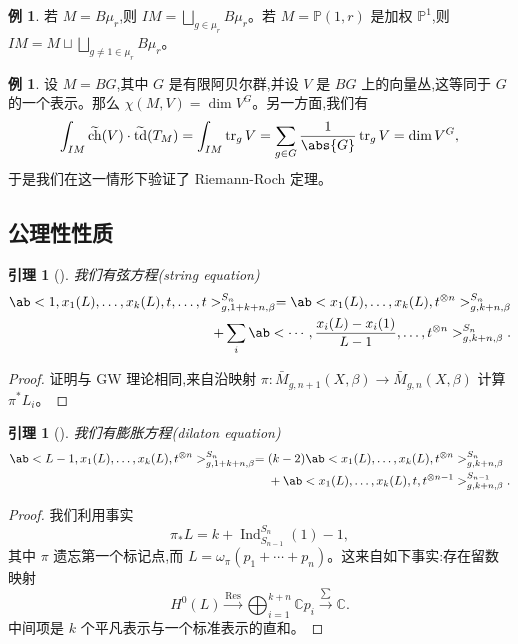 \documentclass{amsart}
\newtheorem{lem}[thm]{引理}
\theoremstyle{definition}
\newtheorem{exm}[thm]{例}
\theoremstyle{remark}
\theoremstyle{plain}
\theoremstyle{definition}
\theoremstyle{remark}
\newcommand{\C}{\mathbb{C}}
\renewcommand{\P}{\mathbb{P}}
\newcommand{\on}[1]{\operatorname{#1}}
\newcommand{\wt}[1]{\widetilde{#1}}
\newcommand{\1}{\mathbf{1}}
\newcommand{\2}{\mathbf{2}}
\newcommand{\3}{\mathbf{3}}
\begin{document}
\begin{exm}
    若 \(M = B\mu_r\),则 \(IM = \bigsqcup_{g \in \mu_r} B \mu_r\)。若 \(M = \P(1, r)\) 是加权 \(\P^1\),则 \(IM = M \sqcup \bigsqcup_{g \neq 1 \in \mu_r} B\mu_r\)。
\end{exm}

\begin{exm}
    设 \(M = BG\),其中 \(G\) 是有限阿贝尔群,并设 \(V\) 是 \(BG\) 上的向量丛,这等同于 \(G\) 的一个表示。那么 \(\chi(M, V) = \dim V^G\)。另一方面,我们有
    \[ \int_{IM} \wt{\on{ch}}(V) \cdot \wt{\on{td}}(T_M) = \int_{IM} \on{tr}_g V = \sum_{g \in G} \frac{1}{\abs{G}} \on{tr}_g V = \dim V^G, \]
    于是我们在这一情形下验证了 Riemann-Roch 定理。
\end{exm}

\subsection{公理性性质}%
\label{sub:Axiomatic properties}

\begin{lem}[{\cite{GiventalK7}}]
    我们有\textit{弦方程}(string equation)
    \begin{align*}
        \ab< 1, x_1(L), \ldots, x_k(L), t, \ldots, t >_{g, 1+k+n, \beta}^{S_n} = \ab<x_1(L), \ldots, x_k(L), t^{\otimes n}>^{S_n}_{g,k+n,\beta} \\
        + \sum_i \ab< \cdots, \frac{x_i(L) - x_i(1)}{L-1}, \ldots, t^{\otimes n}>^{S_n}_{g,k+n,\beta}.
    \end{align*}
\end{lem}

\begin{proof}
    证明与 GW 理论相同,来自沿映射 \(\pi \colon\bar{M}_{g,n+1}(X,\beta) \to \bar{M}_{g,n}(X,\beta)\) 计算 \(\pi^* L_i\)。
\end{proof}

\begin{lem}[{\cite{GiventalK7}}]
    我们有\textit{膨胀方程}(dilaton equation)
    \begin{align*}
        \ab<L-1, x_1(L), \ldots, x_k(L), t^{\otimes n}>_{g,1+k+n,\beta}^{S_n} ={}& (k-2)\ab<x_1(L), \ldots, x_k(L), t^{\otimes n}>_{g,k+n,\beta}^{S_n} \\
        &+ \ab<x_1(L), \ldots, x_k(L), t, t^{\otimes n-1}>_{g,k+n,\beta}^{S_{n-1}}.
    \end{align*}
\end{lem}

\begin{proof}
    我们利用事实
    \[ \pi_* L = k + \on{Ind}_{S_{n-1}}^{S_n}(1) - 1, \]
    其中 \(\pi\) 遗忘第一个标记点,而 \(L = \omega_{\pi} (p_1 + \cdots + p_n)\)。这来自如下事实:存在留数映射
    \[ H^0(L) \xrightarrow{\on{Res}} \bigoplus_{i=1}^{k+n} \C p_i \xrightarrow{\sum} \C. \]
    中间项是 \(k\) 个平凡表示与一个标准表示的直和。
\end{proof}
\end{document}
